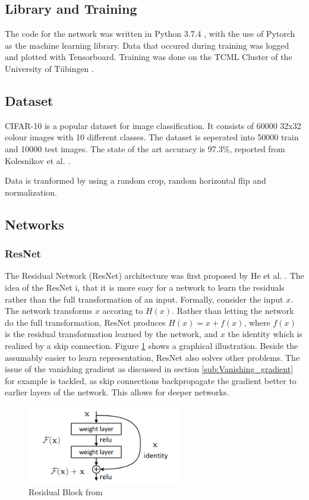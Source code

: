 \subsection{Library and Training}
The code for the network was written in Python 3.7.4 , with the use of Pytorch
\cite{NEURIPS2019_9015} as the machine learning library. Data that occured
during training was logged and plotted with Tensorboard. Training was done on
the TCML Cluster of the University of Tübingen \cite{TCML}.

\subsection{Dataset}\label{sub:Dataset}
CIFAR-10 \cite{CIFAR-10} is a popular dataset for image classification. It
consists of 60000 32x32 colour images with 10 different classes. The dataset is
seperated into 50000 train and 10000 test images. The state of the art accuracy
is 97.3\%, reported from Kolesnikov et al. \cite{kolesnikov2019big}.

Data is tranformed by using a random crop, random horizontal flip and
normalization.


\subsection{Networks}
\subsubsection{ResNet}\label{sub:ResNet}
The Residual Network (ResNet) architecture was first proposed by He et al.
\cite{he2016deep}. The idea of the ResNet i, that it is more easy for a
network to learn the residuals rather than the full transformation of an input.
Formally, consider the input $x$. The network transforms $x$ accoring to $H(x)$.
Rather than letting the network do the full transformation, ResNet produces
$H(x)= x +f(x)$, where $f(x)$ is the residual transformation learned by the
network, and $x$ the identity which is realized by a skip connection. Figure
\ref{fig:Residual_Block} shows a graphical illustration. Beside the assumably
easier to learn representation, ResNet also solves other problems. The issue of
the vanishing gradient as discussed in section \ref{sub:Vanishing_gradient} for
example is tackled, as skip connections backpropagate the gradient better to
earlier layers of the network. This allows for deeper networks.

\begin{figure}[h]
    \centering
    \includegraphics[width=0.6\textwidth]{images/Residual_Block.png}
    \caption{Residual Block from \cite[Page 2]{he2016deep}}
    \label{fig:Residual_Block}
\end{figure}

